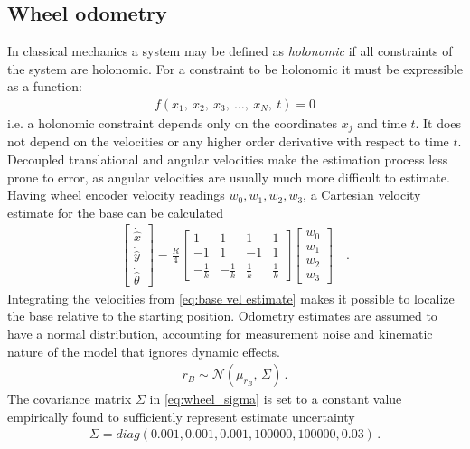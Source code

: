 \documentclass[times, utf8, diplomski, english]{fer}
\begin{document}
\subsection{Wheel odometry}
In classical mechanics a system may be defined as \textit{holonomic} if all constraints of the system are holonomic. For a constraint to be holonomic it must be expressible as a function:
\begin{align}
f(x_1,\ x_2,\ x_3,\ \ldots,\ x_N,\ t)=0
\end{align} 
i.e. a holonomic constraint depends only on the coordinates $x_j$ and time $t$. It does not depend on the velocities or any higher order derivative with respect to time $t$.
Decoupled translational and angular velocities make the estimation process less prone to error, as angular velocities are usually much more difficult to estimate.
Having wheel encoder velocity readings $w_0,w_1,w_2,w_3$, a Cartesian velocity estimate for the base can be calculated
\begin{align}
\begin{bmatrix}
\dot{\hat{x}} \\
\dot{\hat{y}} \\
\dot{\hat{\theta}}
\end{bmatrix}
= 
\frac{R}{4}
\begin{bmatrix}
1 &1 &1 &1 \\
-1 &1 &-1 &1 \\
-\frac{1}{k} &-\frac{1}{k} &\frac{1}{k} &\frac{1}{k}
\end{bmatrix}
\begin{bmatrix}
w_0 \\
w_1 \\
w_2 \\ 
w_3
\end{bmatrix} \quad .
\label{eq:base vel estimate}
\end{align}
Integrating the velocities from \eqref{eq:base vel estimate} makes it possible to localize the base relative to the starting position.
Odometry estimates are assumed to have a normal distribution, accounting for measurement noise and kinematic nature of the model that ignores dynamic effects.
\begin{align}\label{eq:wheel_sigma}
r_{B} \sim \mathcal{N}(\mu_{r_B},\,\Sigma)\,.
\end{align}
The covariance matrix $\Sigma$ in \eqref{eq:wheel_sigma} is set to a constant value empirically found to sufficiently represent estimate uncertainty
\begin{align}
\Sigma 
=
diag\left(0.001,0.001,0.001,100000,100000,0.03\right)\,.
\end{align}
\end{document}
